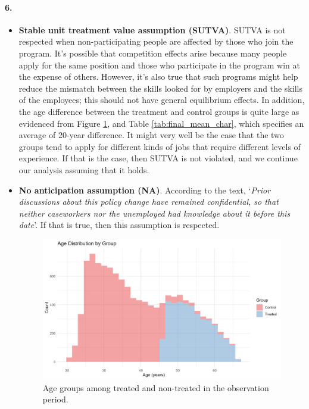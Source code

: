 \documentclass{scrartcl}
\begin{document}
\paragraph*{6.}

\begin{itemize}[label=$\blacktriangleright$]
    \item \textbf{Stable unit treatment value assumption (SUTVA)}. SUTVA is not respected when non-participating people are affected by those who join the program. It's possible that competition effects arise because many people apply for the same position and those who participate in the program win at the expense of others. However, it's also true that such programs might help reduce the mismatch between the skills looked for by employers and the skills of the employees; this should not have general equilibrium effects. In addition, the age difference between the treatment and control groups is quite large as evidenced from Figure \ref{fig:age_hist}, and Table \ref{tab:final_mean_char}, which specifies an average of 20-year difference. It might very well be the case that the two groups tend to apply for different kinds of jobs that require different levels of experience. If that is the case, then SUTVA is not violated, and we continue our analysis assuming that it holds.\

    \item \textbf{No anticipation assumption (NA)}. According to the text, `\textit{Prior discussions about this policy change have remained confidential, so that neither caseworkers nor the unemployed had knowledge about it before this date}'. If that is true, then this assumption is respected. \

        \begin{figure}
            \centering
            \includegraphics[width=0.75\linewidth]{output/figures/final_histogram_age.jpg}
            \caption{Age groups among treated and non-treated in the observation period.}
            \label{fig:age_hist}
        \end{figure}


\end{itemize}
\end{document}
